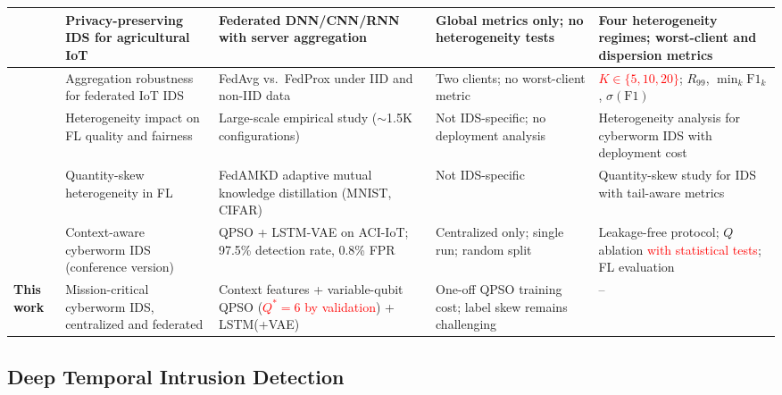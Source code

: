 \documentclass[conference]{IEEEtran}
\begin{document}
\begin{table}[!htbp]
\begin{tabular}{>{\raggedright\arraybackslash}p{1.0cm} >{\raggedright\arraybackslash}p{2.6cm} >{\raggedright\arraybackslash}p{4.0cm} >{\raggedright\arraybackslash}p{3.2cm} >{\raggedright\arraybackslash}p{4.4cm}}
\midrule

\cite{FRIHA202217} & Privacy-preserving IDS for agricultural IoT & Federated DNN/CNN/RNN with server aggregation & Global metrics only; no heterogeneity tests & Four heterogeneity regimes; worst-client and dispersion metrics \\

\midrule

\cite{herlambangfederated} & Aggregation robustness for federated IoT IDS & FedAvg vs.\ FedProx under IID and non-IID data & Two clients; no worst-client metric & \textcolor{red}{$K\in\{5,10,20\}$}; $R_{99}$, $\min_k\mathrm{F1}_k$, $\sigma(\mathrm{F1})$ \\

\midrule

\cite{abdelmoniemcomprehensive} & Heterogeneity impact on FL quality and fairness & Large-scale empirical study (${\sim}$1.5K configurations) & Not IDS-specific; no deployment analysis & Heterogeneity analysis for cyberworm IDS with deployment cost \\

\midrule

\cite{gefedamkd} & Quantity-skew heterogeneity in FL & FedAMKD adaptive mutual knowledge distillation (MNIST, CIFAR) & Not IDS-specific & Quantity-skew study for IDS with tail-aware metrics \\

\midrule

\cite{ajakweconquest} & Context-aware cyberworm IDS (conference version) & QPSO + LSTM-VAE on ACI-IoT; 97.5\% detection rate, 0.8\% FPR & Centralized only; single run; random split & Leakage-free protocol; $Q$ ablation \textcolor{red}{with statistical tests}; FL evaluation \\

\midrule

\textbf{This work} & Mission-critical cyberworm IDS, centralized and federated & Context features + variable-qubit QPSO (\textcolor{red}{$Q^{*}{=}6$ by validation}) + LSTM(+VAE) & One-off QPSO training cost; label skew remains challenging & -- \\

\hline\toprule
\end{tabular}
\end{table}

\subsection{Deep Temporal Intrusion Detection}
\end{document}
